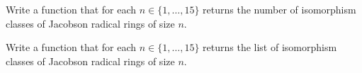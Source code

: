 %

\begin{prob}
	Write a function that for each $n\in\{1,\dots,15\}$ returns the number of
	isomorphism classes of Jacobson radical rings of size $n$. 
\end{prob}

\begin{prob}
	Write a function that for each $n\in\{1,\dots,15\}$ returns the list of
	isomorphism classes of Jacobson radical rings of size $n$. 
\end{prob}



